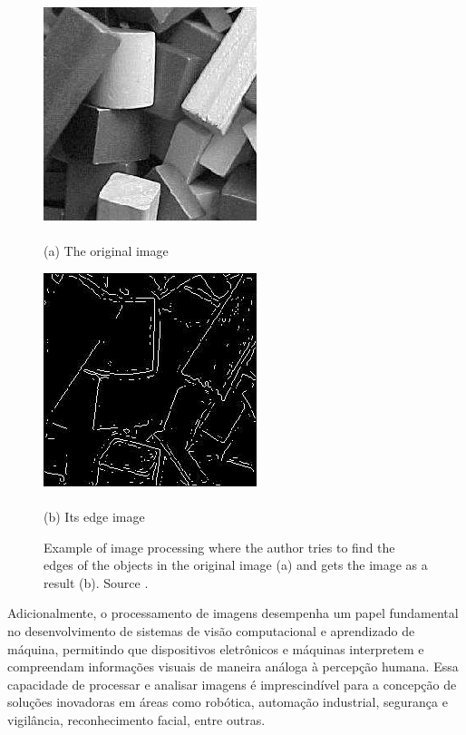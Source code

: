 \begin{figure}[h!]
\begin{minipage}{0.45\linewidth}
\centering
\includegraphics[scale=.65]{images/Development/chap3/woods_original.png}\\\\
(a) The original image
\end{minipage} \hspace{0.025\linewidth}
\begin{minipage}{0.45\linewidth}
\centering
\includegraphics[scale=.65]{images/Development/chap3/woods_processed.png}\\\\
(b)  Its edge image
\end{minipage}
\caption{Example of image processing where the author tries to find the edges of the objects in the original image (a) and gets the image as a result (b). Source \cite{mcandrew2004introduction}. }
\label{fig:imageProcessingExample}
\end{figure}


Adicionalmente, o processamento de imagens desempenha um papel fundamental no desenvolvimento de sistemas de visão computacional e aprendizado de máquina, permitindo que dispositivos eletrônicos e máquinas interpretem e compreendam informações visuais de maneira análoga à percepção humana. Essa capacidade de processar e analisar imagens é imprescindível para a concepção de soluções inovadoras em áreas como robótica, automação industrial, segurança e vigilância, reconhecimento facial, entre outras.


